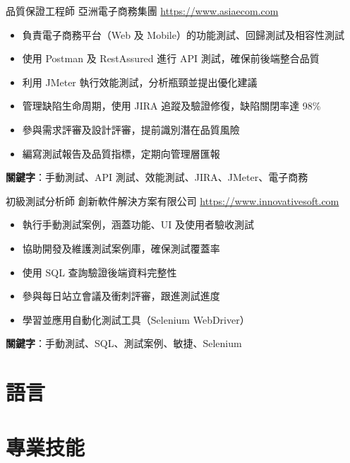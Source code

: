 \documentclass[a4paper, serif, 10pt]{moderncv}
\begin{document}
        {品質保證工程師}
        {亞洲電子商務集團}
        {\url{https://www.asiaecom.com}}
        {}
        {\begin{itemize}
\item 負責電子商務平台（Web 及 Mobile）的功能測試、回歸測試及相容性測試
\item 使用 Postman 及 RestAssured 進行 API 測試，確保前後端整合品質
\item 利用 JMeter 執行效能測試，分析瓶頸並提出優化建議
\item 管理缺陷生命周期，使用 JIRA 追蹤及驗證修復，缺陷關閉率達 98\%
\item 參與需求評審及設計評審，提前識別潛在品質風險
\item 編寫測試報告及品質指標，定期向管理層匯報
\end{itemize}
\textbf{關鍵字}：手動測試、API 測試、效能測試、JIRA、JMeter、電子商務}

        {初級測試分析師}
        {創新軟件解決方案有限公司}
        {\url{https://www.innovativesoft.com}}
        {}
        {\begin{itemize}
\item 執行手動測試案例，涵蓋功能、UI 及使用者驗收測試
\item 協助開發及維護測試案例庫，確保測試覆蓋率
\item 使用 SQL 查詢驗證後端資料完整性
\item 參與每日站立會議及衝刺評審，跟進測試進度
\item 學習並應用自動化測試工具（Selenium WebDriver）
\end{itemize}
\textbf{關鍵字}：手動測試、SQL、測試案例、敏捷、Selenium}
\section{語言}

\section{專業技能}

\end{document}
